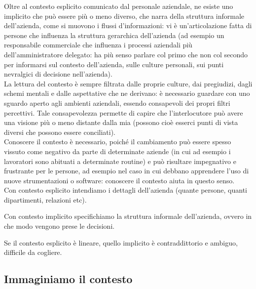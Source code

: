Oltre al contesto esplicito comunicato dal  personale aziendale, ne esiste uno
implicito che pu\`o essere pi\`u o meno diverso, che  narra della struttura
informale dell'azienda, come si muovono i flussi d'informazioni: vi \`e
un'articolazione fatta di persone che influenza la struttura gerarchica
dell'azienda (ad esempio un responsabile  commerciale che influenza i processi
aziendali pi\`u dell'amministratore  delegato: ha pi\`u senso parlare col primo
che non col secondo per  informarsi sul contesto dell'azienda, sulle culture
personali, sui punti nevralgici di decisione nell'azienda). \\
La  lettura del contesto \`e sempre filtrata dalle proprie culture, dai
pregiudizi, dagli schemi mentali e dalle aspettative che ne derivano: \`e necessario
guardare con uno sguardo aperto agli ambienti aziendali, essendo consapevoli
dei propri filtri percettivi. Tale consapevolezza permette di capire che
l'interlocutore  pu\`o avere una visione pi\`u o meno distante dalla mia
(possono cio\`e  esserci punti di vista diversi che possono essere conciliati).\\
Conoscere il contesto \`e necessario, poich\'e il cambiamento pu\`o essere
spesso vissuto come negativo da parte di determinate aziende (in cui  ad
esempio i lavoratori sono abituati a determinate routine) e pu\`o  risultare
impegnativo e frustrante per le persone, ad esempio nel caso in cui debbano
apprendere l'uso di nuove strumentazioni o software: conoscere il  contesto
aiuta in questo senso.\\

Con contesto esplicito intendiamo i dettagli dell'azienda (quante persone,
quanti dipartimenti, relazioni etc).

Con contesto implicito specifichiamo la struttura informale dell'azienda,
ovvero in che modo vengono prese le decisioni.

Se il contesto esplicito \`e lineare, quello implicito \`e contraddittorio e
ambiguo, difficile da cogliere.

\subsection{Immaginiamo il contesto}

